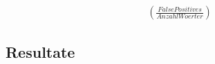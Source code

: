 \documentclass[11pt]{article}
\begin{document}
    \begin{align*}
    (\frac{False Positives}{Anzahl Woerter})
    \end{align*}

    \newpage
    \subsection{Resultate}
\end{document}
